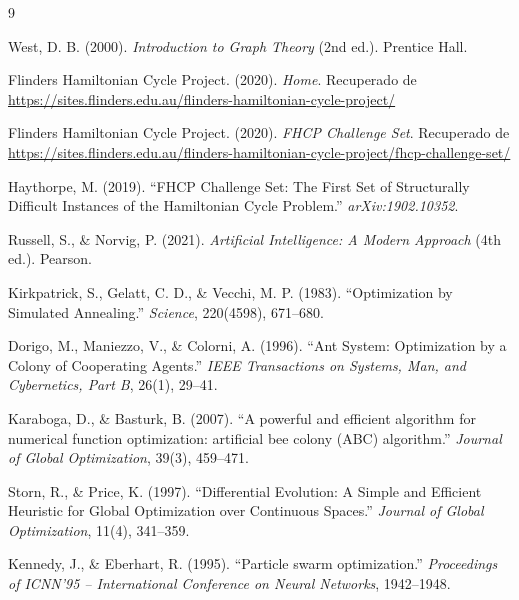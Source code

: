 \documentclass[12pt]{article}
\begin{document}
\begin{thebibliography}{9}

West, D. B. (2000). \textit{Introduction to Graph Theory} (2nd ed.). Prentice Hall.

Flinders Hamiltonian Cycle Project. (2020). \textit{Home}. Recuperado de \url{https://sites.flinders.edu.au/flinders-hamiltonian-cycle-project/}

Flinders Hamiltonian Cycle Project. (2020). \textit{FHCP Challenge Set}. Recuperado de \url{https://sites.flinders.edu.au/flinders-hamiltonian-cycle-project/fhcp-challenge-set/}

Haythorpe, M. (2019). “FHCP Challenge Set: The First Set of Structurally Difficult Instances of the Hamiltonian Cycle Problem.” \textit{arXiv:1902.10352}.

Russell, S., \& Norvig, P. (2021). \textit{Artificial Intelligence: A Modern Approach} (4th ed.). Pearson.

Kirkpatrick, S., Gelatt, C. D., \& Vecchi, M. P. (1983). “Optimization by Simulated Annealing.” \textit{Science}, 220(4598), 671–680.

Dorigo, M., Maniezzo, V., \& Colorni, A. (1996). “Ant System: Optimization by a Colony of Cooperating Agents.” \textit{IEEE Transactions on Systems, Man, and Cybernetics, Part B}, 26(1), 29–41.

Karaboga, D., \& Basturk, B. (2007). “A powerful and efficient algorithm for numerical function optimization: artificial bee colony (ABC) algorithm.” \textit{Journal of Global Optimization}, 39(3), 459–471.

Storn, R., \& Price, K. (1997). “Differential Evolution: A Simple and Efficient Heuristic for Global Optimization over Continuous Spaces.” \textit{Journal of Global Optimization}, 11(4), 341–359.

Kennedy, J., \& Eberhart, R. (1995). “Particle swarm optimization.” \textit{Proceedings of ICNN’95 – International Conference on Neural Networks}, 1942–1948.

\end{thebibliography}
\end{document}
